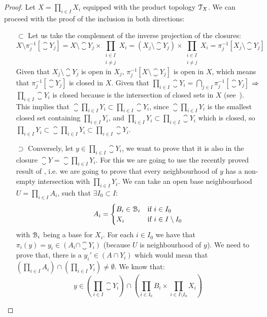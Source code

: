 \begin{proof}Let $X=\prod_{i\in I}X_i$ equipped with the product topology $\EuScript{T}_X$.
We can proceed with the proof of the inclusion in both directions:
\begin{itemize}
\item[$\boxed{\subset}$] Let us take the complement of the inverse projection of the closures:
\[
	X\setminus\pi^{-1}_j[\closure{Y_j}]=X\setminus \closure{Y_j}\times \prod_{\substack{i\in I\\i\neq j}} X_i= (X_j\setminus\closure{Y_j})\times \prod_{\substack{i\in I\\i\neq j}} X_i = \pi^{-1}_j[X_j\setminus\closure{Y_j}]
\]
Given that $X_j\setminus \closure{Y_j}$ is open in $X_j$, $\pi^{-1}_j[X\setminus\closure{Y_j}]$ is open in $X$, which means that $\pi^{-1}_j[\closure{Y_j}]$ is closed in $X$. Given that $\prod_{i\in I}\closure{Y_i}=\bigcap_{j\in I}\pi^{-1}_j[\closure{Y_j}]$ $\Rightarrow$  $\prod_{i\in I}\closure{Y_i}$ is closed because is the intersection of closed sets in $X$ (see~). This implies that
$\closure{\prod_{i\in I}Y_i}\subset\prod_{i\in I}\closure{Y_i}$, since $\closure{\prod_{i\in I}Y_i}$ is the smallest closed set containing $\prod_{i\in I}Y_i$, and $\prod_{i\in I}Y_i\subset\prod_{i\in I}\closure{Y_i}$ which is closed, so $\prod_{i\in I}Y_i\subset \closure{\prod_{i\in I} Y_i}\subset \prod_{i\in I}\closure{Y_i}$.
\item[$\boxed{\supset}$] Conversely, let $y\in \prod_{i\in I}\closure{Y}_i$, we want to prove that it is also in the closure $\closure{Y}=\closure{\prod_{i\in I} Y_i}$.
For this we are going to use the recently proved result of , i.e. we are going to prove that every neighbourhood of $y$ has a non-empty intersection with $\prod_{i\in I}Y_i$. We can take an open base neighbourhood $U=\prod_{i\in I} A_i$, such that $\exists  I_0\subset I$:
\[
	A_i = \begin{cases}
		B_i \in \EuScript{B}_{i} & \text{if } i\in I_0\\
		X_i & \text{if } i\in I\setminus I_0
	\end{cases}
\]
with $\EuScript{B}_{i}$ being a base for $X_i$. For each $i\in I_0$ we have that $\pi_{i}(y)=y_i\in (A_i\cap \closure{Y_i})$ (because $U$ is neighbourhood of $y$). We need to prove that, there is a $y_i'\in (A\cap Y_i)$ which would mean that $(\prod_{i\in I}A_{i}) \cap (\prod_{i\in I}Y_i)\neq \emptyset$.
We know that:
\[
  y\in \left(\prod_{i\in I} \closure{Y_i}\right)\cap \left(\prod_{i\in I_0}B_i\times \prod_{i\in I\setminus I_0} X_i\right)
\]
\end{itemize}
\end{proof}
